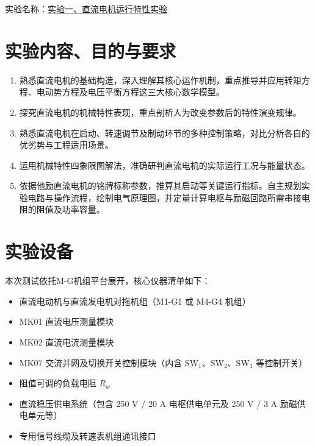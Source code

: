 	\vspace{0.5em}
	
	\begin{framed} 
		{\songti{}
			
			\begin{center}
				{\heiti{}
					{实验名称：\underline{\hspace{2em}实验一、直流电机运行特性实验\hspace{2em}}}
				}
			\end{center}
			
			\section{实验内容、目的与要求}
			\begin{enumerate}
				\item 熟悉直流电机的基础构造，深入理解其核心运作机制，重点推导并应用转矩方程、电动势方程及电压平衡方程这三大核心数学模型。
				\item 探究直流电机的机械特性表现，重点剖析人为改变参数后的特性演变规律。
				\item 熟悉直流电机在启动、转速调节及制动环节的多种控制策略，对比分析各自的优劣势与工程适用场景。
				\item 运用机械特性四象限图解法，准确研判直流电机的实际运行工况与能量状态。
				\item 依据他励直流电机的铭牌标称参数，推算其启动等关键运行指标。自主规划实验电路与操作流程，绘制电气原理图，并定量计算电枢与励磁回路所需串接电阻的阻值及功率容量。
			\end{enumerate}
			
			\section{实验设备}
			本次测试依托M-G机组平台展开，核心仪器清单如下：
			\begin{itemize}
				\item 直流电动机与直流发电机对拖机组（M1-G1 或 M4-G4 机组）
				\item MK01 直流电压测量模块
				\item MK02 直流电流测量模块
				\item MK07 交流并网及切换开关控制模块（内含 $\text{SW}_1$、$\text{SW}_2$、$\text{SW}_3$ 等控制开关）
				\item 阻值可调的负载电阻 $R_w$
				\item 直流稳压供电系统（包含 250 V / 20 A 电枢供电单元及 250 V / 3 A 励磁供电单元等）
				\item 专用信号线缆及转速表机组通讯接口
			\end{itemize}
			
}
\end{framed}
